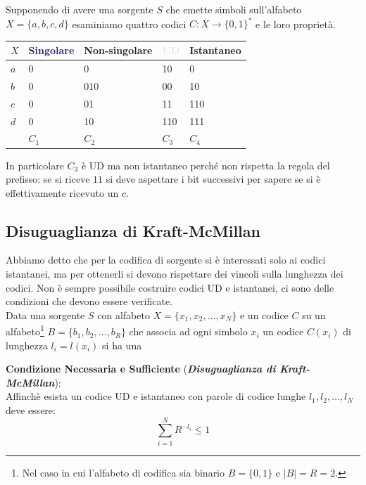 \begin{minipage}{0.45\textwidth}
Supponendo di avere una sorgente $S$ che emette simboli sull'alfabeto $X = \{a,b,c,d\}$ esaminiamo quattro codici $C: X \to \{0,1\}^*$ e le loro propriet\`a.
\begin{table}[H]
\begin{tabular}{l|l|l|l|l}
\toprule
$X$ & \textcolor{MidnightBlue}{Singolare} & \textcolor{RoyalPurple}{Non-singolare} & \textcolor{Lavender}{UD} & \textcolor{Dandelion}{Istantaneo} \\
\midrule
$a$ & 0         & 0             & 10  & 0          \\
$b$ & 0         & 010           & 00  & 10         \\
$c$ & 0         & 01            & 11  & 110        \\
$d$ & 0         & 10            & 110 & 111        \\
\midrule
    & $C_1$     & $C_2$         & $C_3$ & $C_4$ \\
\bottomrule
\end{tabular}
\label{tab:codici}
\end{table}
In particolare $C_3$ è UD ma non istantaneo perché non rispetta la regola del prefisso: se si riceve $11$ si deve aspettare i bit successivi per sapere se si è effettivamente ricevuto un $c$.
\end{minipage}

\subsection{Disuguaglianza di Kraft-McMillan}
Abbiamo detto che per la codifica di sorgente si è interessati solo ai codici istantanei, ma per ottenerli si devono rispettare  dei vincoli sulla lunghezza dei codici. Non è sempre possibile costruire codici UD e istantanei, ci sono delle condizioni che devono essere verificate. \\
Data una sorgente $S$ con alfabeto $X = \{x_1, x_2, \dots, x_N\}$ e un codice $C$ su un alfabeto\footnote{Nel caso in cui l'alfabeto di codifica sia binario $B = \{0,1\}$ e $|B|=R=2$.} $B = \{b_1, b_2, \dots, b_R\}$ che associa ad ogni simbolo $x_i$ un codice $C(x_i)$ di lunghezza $l_i = l(x_i)$ si ha una 

\textbf{Condizione Necessaria e Sufficiente} (\textbf{\textit{Disuguaglianza di Kraft-McMillan}}): \\
Affinch\`e esista un codice UD e istantaneo con parole di codice lunghe $l_1, l_2, \dots, l_N$ deve essere:
\begin{equation}
    \sum_{i=1}^N R^{-l_i} \leq 1
\end{equation}

